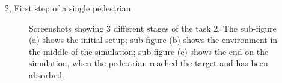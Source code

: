 \documentclass[10pt,a4paper]{article}
\begin{document}
\begin{task}{2, First step of a single pedestrian}
\begin{figure}[H]
    \centering
    \hfill
    \hfill
    \caption{Screenshots showing 3 different stages of the task 2. The sub-figure (a) shows the initial setup; sub-figure (b) shows the environment in the middle of the simulation; sub-figure (c) shows the end on the simulation, when the pedestrian reached the target and has been absorbed.}
    \label{fig:task2}
\end{figure}
\end{task}
\end{document}
